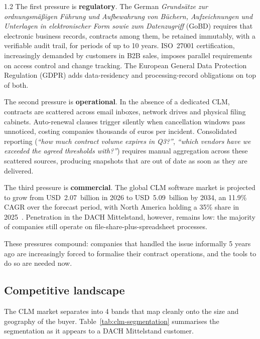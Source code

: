 \begin{spacing}{1.2}
The first pressure is \textbf{regulatory}. The German \textit{Grundsätze
zur ordnungsmäßigen Führung und Aufbewahrung von Büchern, Aufzeichnungen
und Unterlagen in elektronischer Form sowie zum Datenzugriff} (GoBD)
requires that electronic business records, contracts among them, be
retained immutably, with a verifiable audit trail, for periods of up to
10 years. ISO~27001 certification, increasingly demanded by customers in
B2B sales, imposes parallel requirements on access control and change
tracking. The European General Data Protection Regulation (GDPR) adds
data-residency and processing-record obligations on top of both.

The second pressure is \textbf{operational}. In the absence of a dedicated
CLM, contracts are scattered across email inboxes, network drives and
physical filing cabinets. Auto-renewal clauses trigger silently when
cancellation windows pass unnoticed, costing companies thousands of euros
per incident. Consolidated reporting (\textit{``how much contract volume
expires in Q3?''}, \textit{``which vendors have we exceeded the agreed
thresholds with?''}) requires manual aggregation across these scattered
sources, producing snapshots that are out of date as soon as they are delivered.

The third pressure is \textbf{commercial}. The global CLM software market
is projected to grow from USD~2.07~billion in 2026 to USD~5.09~billion by
2034, an 11.9\% CAGR over the forecast period, with North America
holding a 35\% share in 2025~\cite{FortuneBusinessInsightsCLM}.
Penetration in the DACH Mittelstand, however, remains low: the majority
of companies still operate on file-share-plus-spreadsheet processes.

These pressures compound: companies that
handled the issue informally 5 years ago are increasingly forced to
formalise their contract operations, and the tools to do so are needed
now.

\subsection{Competitive landscape}
\label{sec:competitive-landscape}
The CLM market separates into 4 bands that map cleanly onto the size
and geography of the buyer. Table~\ref{tab:clm-segmentation} summarises the
segmentation as it appears to a DACH Mittelstand customer.


\end{spacing}

